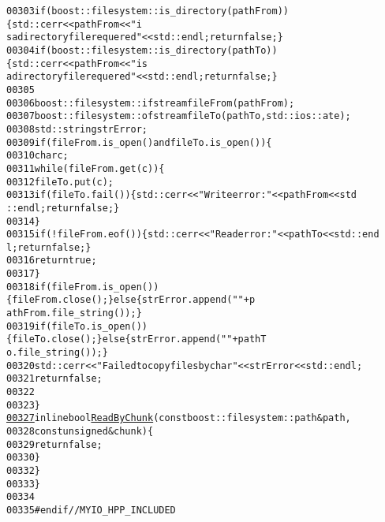 \begin{footnotesize}
\begin{alltt}
00303         \textcolor{keywordflow}{if} ( boost::filesystem::is\_directory(pathFrom) )\{std::cerr<<pathFrom<<\textcolor{stringliteral}{" i
      s a directory file requered"}<<std::endl; \textcolor{keywordflow}{return} \textcolor{keyword}{false}; \}
00304         \textcolor{keywordflow}{if} ( boost::filesystem::is\_directory(pathTo) )\{ std::cerr<<pathFrom<<\textcolor{stringliteral}{" is
       a directory file requered"}<<std::endl; \textcolor{keywordflow}{return} \textcolor{keyword}{false}; \}
00305 
00306         boost::filesystem::ifstream fileFrom (pathFrom);
00307         boost::filesystem::ofstream fileTo (pathTo,std::ios::ate);
00308         std::string strError;
00309         \textcolor{keywordflow}{if} (fileFrom.is\_open() and fileTo.is\_open())\{
00310             \textcolor{keywordtype}{char} c;
00311             \textcolor{keywordflow}{while} (fileFrom.get(c))\{
00312                 fileTo.put(c);
00313                 \textcolor{keywordflow}{if} ( fileTo.fail() ) \{ std::cerr << \textcolor{stringliteral}{"Write error:"}<<pathFrom<<std
      ::endl; \textcolor{keywordflow}{return} \textcolor{keyword}{false}; \}
00314             \}
00315             \textcolor{keywordflow}{if} ( !fileFrom.eof() ) \{ std::cerr << \textcolor{stringliteral}{"Read error:"}<<pathTo<<std::end
      l; \textcolor{keywordflow}{return} \textcolor{keyword}{false}; \}
00316             \textcolor{keywordflow}{return} \textcolor{keyword}{true};
00317         \}
00318         \textcolor{keywordflow}{if} (fileFrom.is\_open())\{ fileFrom.close(); \} \textcolor{keywordflow}{else} \{ strError.append(\textcolor{stringliteral}{" "}+p
      athFrom.file\_string()); \}
00319         \textcolor{keywordflow}{if} (fileTo.is\_open())\{ fileTo.close(); \} \textcolor{keywordflow}{else} \{ strError.append(\textcolor{stringliteral}{" "}+pathT
      o.file\_string()); \}
00320         std::cerr<<\textcolor{stringliteral}{"Failed to copy files by char"}<<strError<<std::endl;
00321         \textcolor{keywordflow}{return} \textcolor{keyword}{false};
00322 
00323     \}
\hypertarget{myIO_8hpp_source_l00327}{}\hyperlink{group__libbuskol_gac93438593df503ce260ed0a9ec1e5249}{00327}     \textcolor{keyword}{inline} \textcolor{keywordtype}{bool} \hyperlink{group__libbuskol_gac93438593df503ce260ed0a9ec1e5249}{ReadByChunk}(\textcolor{keyword}{const} boost::filesystem::path &path,
00328                             \textcolor{keyword}{const} \textcolor{keywordtype}{unsigned} &chunk)\{
00329         \textcolor{keywordflow}{return} \textcolor{keyword}{false};
00330     \}
00332    \}
00333 \}
00334 
00335 \textcolor{preprocessor}{#endif // MYIO\_HPP\_INCLUDED}
\end{alltt}\end{footnotesize}
